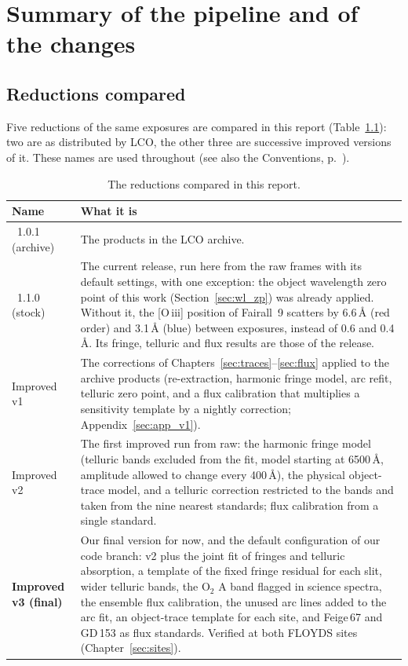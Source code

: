 \chapter{Summary of the pipeline and of the changes}
\label{sec:summary}

\section*{Reductions compared}
Five reductions of the same exposures are compared in this report (Table~\ref{tab:versions_names}): two are
\banzai{} as distributed by LCO, the other three are successive improved versions of it. These names are used
throughout (see also the Conventions, p.~\pageref{sec:conventions}).

\begin{table}[!htbp]
\centering
\caption{The reductions compared in this report.}
\label{tab:versions_names}
\small
\begin{tabular}{@{}lp{11.3cm}@{}}
\toprule
Name & What it is \\
\midrule
\banzai{}~1.0.1 (archive) & The products in the LCO archive. \\
\banzai{}~1.1.0 (stock) & The current release, run here from the raw frames with its default settings, with one
exception: the object wavelength zero point of this work (Section~\ref{sec:wl_zp}) was already applied. Without it,
the [O\,{\sc iii}] position of Fairall~9 scatters by 6.6\,\AA{} (red order) and 3.1\,\AA{} (blue) between exposures,
instead of 0.6 and 0.4\,\AA. Its fringe, telluric and flux results are those of the release. \\
Improved v1 & The corrections of Chapters~\ref{sec:traces}--\ref{sec:flux} applied to the archive products
(re-extraction, harmonic fringe model, arc refit, telluric zero point, and a flux calibration that multiplies a
sensitivity template by a nightly correction; Appendix~\ref{sec:app_v1}). \\
Improved v2 & The first improved \banzai{} run from raw: the harmonic fringe model (telluric bands excluded from
the fit, model starting at 6500\,\AA, amplitude allowed to change every 400\,\AA), the physical object-trace model,
and a telluric correction restricted to the bands and taken from the nine nearest standards; flux calibration from a
single standard. \\
\textbf{Improved v3 (final)} & Our final version for now, and the default configuration of our code branch: v2 plus
the joint fit of fringes and telluric absorption, a template of the fixed fringe residual for each slit, wider telluric bands, the O$_2$ A band flagged
in science spectra, the ensemble flux calibration, the unused arc lines added to the arc fit, an object-trace template
for each site, and Feige\,67 and GD\,153 as flux standards. Verified at both FLOYDS sites (Chapter~\ref{sec:sites}). \\
\bottomrule
\end{tabular}
\end{table}

